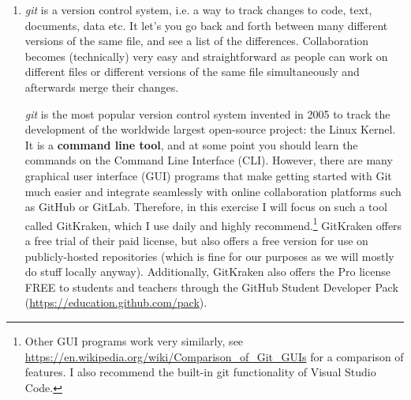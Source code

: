\begin{enumerate}
\item \emph{git} is a version control system, i.e. a way to track changes to code, text, documents, data etc.
	It let's you go back and forth between many different versions of the same file, and see a list of the differences.
	Collaboration becomes (technically) very easy and straightforward as people can work on different files or different versions of the same file simultaneously
  	  and afterwards merge their changes.
	
	\emph{git} is the most popular version control system invented in 2005 to track the development of the worldwide largest open-source project: the Linux Kernel.
    It is a \textbf{command line tool}, and at some point you should learn the commands on the Command Line Interface (CLI).
	However, there are many graphical user interface (GUI) programs that make getting started with Git much easier
	  and integrate seamlessly with online collaboration platforms such as GitHub or GitLab.
	Therefore, in this exercise I will focus on such a tool called GitKraken,
	  which I use daily and highly recommend.\footnote{Other GUI programs work very similarly,
	  see \url{https://en.wikipedia.org/wiki/Comparison_of_Git_GUIs} for a comparison of features.
	  I also recommend the built-in git functionality of Visual Studio Code.}
	GitKraken offers a free trial of their paid license,
	  but also offers a free version for use on publicly-hosted repositories (which is fine for our purposes as we will mostly do stuff locally anyway).
	Additionally, GitKraken also offers the Pro license FREE to students and teachers through the GitHub Student Developer Pack (\url{https://education.github.com/pack}).
	

\end{enumerate}
